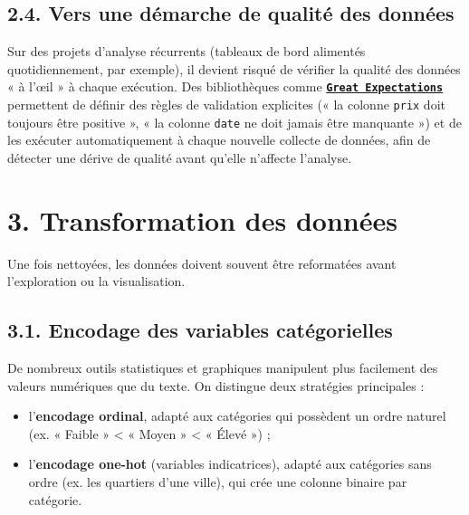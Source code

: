 \documentclass[
  french,
  letterpaper,
  open=any]{scrbook}
\providecommand{\tightlist}{%
  \setlength{\itemsep}{0pt}\setlength{\parskip}{0pt}}
\theoremstyle{definition}
\theoremstyle{definition}
\theoremstyle{remark}
\begin{document}
\subsection{2.4. Vers une démarche de qualité des
données}\label{vers-une-duxe9marche-de-qualituxe9-des-donnuxe9es}

\begin{tcolorbox}[enhanced jigsaw, arc=.35mm, bottomrule=.15mm, bottomtitle=1mm, breakable, colback=white, colbacktitle=quarto-callout-important-color!10!white, colframe=quarto-callout-important-color-frame, coltitle=black, left=2mm, leftrule=.75mm, opacityback=0, opacitybacktitle=0.6, rightrule=.15mm, title=\textcolor{quarto-callout-important-color}{\faExclamation}\hspace{0.5em}{Zoom sur les tendances : la validation systématique de la qualité}, titlerule=0mm, toprule=.15mm, toptitle=1mm]

Sur des projets d'analyse récurrents (tableaux de bord alimentés
quotidiennement, par exemple), il devient risqué de vérifier la qualité
des données « à l'œil » à chaque exécution. Des bibliothèques comme
\textbf{\href{https://greatexpectations.io}{\texttt{Great\ Expectations}}}
permettent de définir des règles de validation explicites (« la colonne
\texttt{prix} doit toujours être positive », « la colonne \texttt{date}
ne doit jamais être manquante ») et de les exécuter automatiquement à
chaque nouvelle collecte de données, afin de détecter une dérive de
qualité avant qu'elle n'affecte l'analyse.

\end{tcolorbox}

\section{3. Transformation des
données}\label{transformation-des-donnuxe9es}

Une fois nettoyées, les données doivent souvent être reformatées avant
l'exploration ou la visualisation.

\subsection{3.1. Encodage des variables
catégorielles}\label{encodage-des-variables-catuxe9gorielles}

De nombreux outils statistiques et graphiques manipulent plus facilement
des valeurs numériques que du texte. On distingue deux stratégies
principales :

\begin{itemize}
\tightlist
\item
  l'\textbf{encodage ordinal}, adapté aux catégories qui possèdent un
  ordre naturel (ex. « Faible » \textless{} « Moyen » \textless{} «
  Élevé ») ;
\item
  l'\textbf{encodage one-hot} (variables indicatrices), adapté aux
  catégories sans ordre (ex. les quartiers d'une ville), qui crée une
  colonne binaire par catégorie.
\end{itemize}
\end{document}
